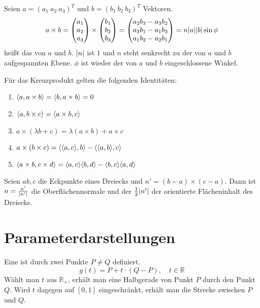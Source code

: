 \begin{Definition}[Kreuzprodukt]
	Seien $a = \left(a_1~a_2~a_3\right)^T$ und $b = \left(b_1~b_2~b_3\right)^T$ Vektoren.
	\[
		a \times b =
		\begin{pmatrix}
			a_1 \\
			a_2 \\
			a_3
		\end{pmatrix}
		\times
		\begin{pmatrix}
			b_1 \\
			b_2 \\
			b_3
		\end{pmatrix}
		=
		\begin{pmatrix}
			a_2b_3 - a_3b_2 \\
			a_3b_1 - a_1b_3 \\
			a_1b_2 - a_2b_1
		\end{pmatrix}
		=
		n \vert a \vert \vert b \vert \sin \phi
	\]
	heißt das  von $a$ und $b$.
	$\vert n \vert$ ist $1$ und $n$ steht senkrecht zu der von $a$ und $b$ aufgespannten Ebene.
	$\phi$ ist wieder der von $a$ und $b$ eingeschlossene Winkel.
\end{Definition}
Für das Kreuzprodukt gelten die folgenden Identitäten:
\begin{enumerate}[label=(\roman*)]
	\item $\langle a, a \times b \rangle = \langle b, a \times b \rangle = 0$
	\item $\langle a, b \times c \rangle = \langle a \times b, c \rangle$
	\item $a \times (\lambda b + c) = \lambda(a \times b) + a \times c$
	\item $a \times (b \times c) = \langle \langle a, c \rangle, b \rangle - \langle \langle a, b \rangle, c \rangle$
	\item $\langle a \times b, c \times d \rangle = \langle a, c \rangle\langle b, d \rangle - \langle b, c \rangle\langle a, d \rangle$
\end{enumerate}

\begin{Beispiel}
	Seien $a b, c$ die Eckpunkte eines Dreiecks und $n' = (b - a) \times (c - a)$.
	Dann ist $n = \frac{n'}{\vert n' \vert}$ die Oberflächennormale und der $\frac{1}{2}\vert n' \vert$ der orientierte Flächeninhalt des Dreiecks.
\end{Beispiel}

\section{Parameterdarstellungen}
Eine  ist durch zwei Punkte $P \neq Q$ definiert.
\[
	g(t) = P + t \cdot (Q - P), \quad t \in \mathbb{R}
\]
Wählt man $t$ aus $\mathbb{R}_+$, erhält man eine Halbgerade von Punkt $P$ durch den Punkt $Q$.
Wird $t$ dagegen auf $[0, 1]$ eingeschränkt, erhält man die Strecke zwischen $P$ und $Q$.

